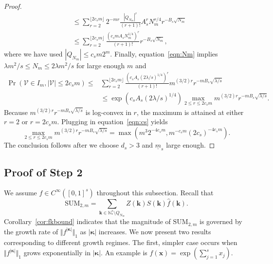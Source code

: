 \documentclass{article}
\theoremstyle{definition}
\renewcommand{\le}{\leqslant}
\renewcommand{\leq}{\leqslant}
\newcommand{\natu}{\mathbb{N}}
\newcommand{\bsk}{\boldsymbol{k}}
\newcommand{\bsx}{\boldsymbol{x}}
\newcommand{\bskappa}{\boldsymbol{\kappa}}
\begin{document}
\begin{proof}
\begin{align*}
        &\le\sum_{r=2}^{\lfloor2c_sm\rfloor}2^{-mr}\frac{|Q_{N_m}|^{r}}{(r+1)!}A^r_s N_m^{r/4} r^{-B_s\sqrt{N_m}}\\
        &\leq \sum_{r=2}^{\lfloor2c_sm\rfloor} \frac{(c_s m A_s N_m^{1/4})^r}{(r+1)!}r^{-B_s\sqrt{N_m}},
    \end{align*}
    where we have used $|Q_{N_m}|\le c_sm 2^m$. Finally, equation~\eqref{eqn:Nm} implies $\lambda m^2/s\leq N_m \leq 2\lambda m^2/s$ for large enough $m$ and
    \begin{align*}
        \Pr(\mathcal{V}\in I_m, |\mathcal{V}|\leq 2c_sm ) \leq &\sum_{r=2}^{\lfloor2c_sm\rfloor} \frac{( c_sA_s (2\lambda/s)^{1/4})^r}{(r+1)!} m^{(3/2)r}r^{-mB_s\sqrt{\lambda/s}}\\
        & \leq \exp(c_sA_s (2\lambda/s)^{1/4}) \max_{2\leq r\leq 2c_sm}m^{(3/2)r}r^{-mB_s\sqrt{\lambda/s}}.
    \end{align*}
    Because $m^{(3/2)r}r^{-mB_s\sqrt{\lambda/s}}$ is log-convex in $r$, the maximum is attained at either $r=2$ or $r=2c_sm$. Plugging in equation~\eqref{eqn:cs} yields
    $$\max_{2\leq r\leq 2c_sm}m^{(3/2)r}r^{-mB_s\sqrt{\lambda/s}}=\max(m^3 2^{-4c_sm}, m^{-c_sm} (2c_s)^{-4c_sm}).$$
    The conclusion follows after we choose $d_s>3$ and $\underline{m}_s$ large enough.
\end{proof}

\subsection{Proof of Step 2}\label{subsec:step2}
We assume $f\in C^{\infty}([0,1]^s)$ throughout this subsection. Recall that
$$\mathrm{SUM}_{2,m}=\sum_{\bsk\in  \natu_*^s\setminus Q_{N_m}}Z(\bsk)S(\bsk)\hat{f}(\bsk).$$ 
    Corollary~\ref{cor:fkbound} indicates that the magnitude of $\mathrm{SUM}_{2,m}$ is governed by the growth rate of $\Vert f^{|\bskappa|}\Vert_1$ as $|\bskappa|$ increases. We now present two results corresponding to different growth regimes. The first, simpler case occurs when $\Vert f^{|\bskappa|}\Vert_1$ grows exponentially in $|\bskappa|$. An example is $f(\bsx)=\exp(\sum_{j=1}^s x_j)$.
\end{document}
